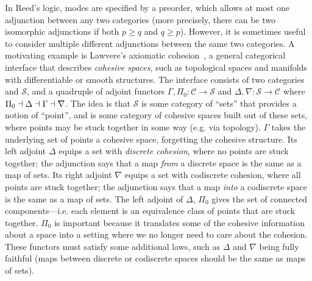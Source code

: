 \documentclass{drl-common/llncs}
\begin{document}
In Reed's logic, modes are specified by a preorder, which allows at most
one adjunction between any two categories (more precisely, there can be
two isomorphic adjunctions if both $p \ge q$ and $q \ge p$).  However,
it is sometimes useful to consider multiple different adjunctions
between the same two categories.  A motivating example is Lawvere's
axiomatic cohesion~\citep{lawvereXXcohesion}, a general categorical
interface that describes \emph{cohesive spaces}, such as topological
spaces and manifolds with differentiable or smooth structures.  The
interface consists of two categories \C and $\mathcal{S}$, and a
quadruple of adjoint functors $\Gamma,\Pi_0 : \mathcal{C} \to
\mathcal{S}$ and $\Delta,\nabla : \mathcal{S} \to \mathcal{C}$ where
$\Pi_0 \dashv \Delta \dashv \Gamma \dashv \nabla$.  The idea is that
$\mathcal{S}$ is some category of ``sets'' that provides a notion of
``point'', and \C\/ is some category of cohesive spaces built out of
these sets, where points may be stuck together in some way (e.g. via
topology).  $\Gamma$ takes the underlying set of points a cohesive
space, forgetting the cohesive structure.  Its left adjoint $\Delta$
equips a set with \emph{discrete cohesion}, where no points are stuck
together; the adjunction says that a map \emph{from} a discrete space is
the same as a map of sets.  Its right adjoint $\nabla$ equips a set with
codiscrete cohesion, where all points are stuck together; the adjunction
says that a map \emph{into} a codiscrete space is the same as a map of
sets.  The left adjoint of $\Delta$, $\Pi_0$ gives the set of connected
components---i.e. each element is an equivalence class of points that
are stuck together.  $\Pi_0$ is important because it translates some of
the cohesive information about a space into a setting where we no longer
need to care about the cohesion.  These functors must satisfy some
additional laws, such as $\Delta$ and $\nabla$ being fully faithful
(maps between discrete or codiscrete spaces should be the same as maps
of sets).
\end{document}
